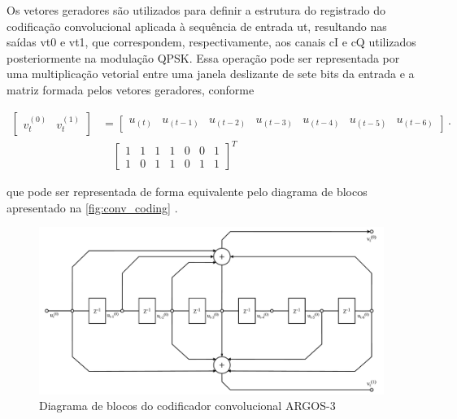 Os vetores geradores são utilizados para definir a estrutura do registrado do codificação convolucional aplicada à sequência de entrada \gls{ut}, resultando nas saídas \gls{vt0} e \gls{vt1}, que correspondem, respectivamente, aos canais \gls{cI} e \gls{cQ} utilizados posteriormente na modulação \gls{QPSK}. Essa operação pode ser representada por uma multiplicação vetorial entre uma janela deslizante de sete bits da entrada e a matriz formada pelos vetores geradores, conforme

\begin{equation}
\begin{aligned}
    \begin{bmatrix}
        v_t^{(0)} & v_t^{(1)}
    \end{bmatrix}
    &=
    \begin{bmatrix}
        u_{(t)} & u_{(t-1)} & u_{(t-2)} & u_{(t-3)} & u_{(t-4)} & u_{(t-5)} & u_{(t-6)}
    \end{bmatrix} \cdot \\
    &\quad
    \begin{bmatrix}
        1 & 1 & 1 & 1 & 0 & 0 & 1 \\
        1 & 0 & 1 & 1 & 0 & 1 & 1
    \end{bmatrix}^{T}
\end{aligned}
\label{eq:matriz_geradora}
\end{equation}

\noindent que pode ser representada de forma equivalente pelo diagrama de blocos apresentado na \autoref{fig:conv_coding} \cite{cnes_services_and_message_formats_ed2_rev2_2006}.

\begin{figure}[H]
	\centering
	\caption{Diagrama de blocos do codificador convolucional ARGOS-3}
	\label{fig:conv_coding}
	\includegraphics[width=\linewidth]{assets/cap2/conv_coding.pdf}
\end{figure}


